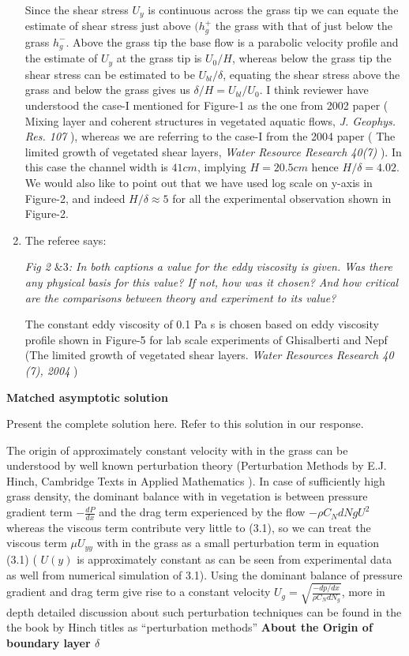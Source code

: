 \documentclass[letterpaper,10pt]{article}
\begin{document}
\begin{enumerate}
Since the shear stress $U_y$ is continuous across the grass tip we can equate the estimate of shear stress just above $(h_g^+$ the grass with that of just below the grass $h_g^{-}$. 
Above the grass tip the base flow is a parabolic velocity profile and the estimate of $U_y$ at the grass tip is $U_0/H$, whereas below the grass tip the shear stress can be estimated to be $U_{bl}/\delta$, equating the shear stress above the grass and below the grass gives us $\delta/H = U_{bl}/U_0$.
I think reviewer have understood the case-I mentioned for Figure-1 as the one from 2002 paper ( Mixing layer and coherent structures in vegetated aquatic flows, \textit{J. Geophys. Res. 107} ), whereas we are referring to the case-I from the 2004 paper ( The limited growth of vegetated shear layers, \textit{Water Resource Research 40(7)} ). In this case the channel width is $41cm$, implying $H=20.5 cm$ hence $H/\delta=4.02$. We would also like to point out that we have used log scale on y-axis in Figure-2, and indeed $H/\delta \approx 5$ for all the experimental observation shown in Figure-2.


\item The referee says:

\textit{  Fig 2 $\& 3$:
In both captions a value for the eddy viscosity is given. Was there any
physical basis for this value? If not, how was it chosen? And how critical
are the comparisons between theory and experiment to its value?
}

The constant eddy viscosity of 0.1 Pa s is chosen based on eddy viscosity profile shown in Figure-5 for lab scale experiments of Ghisalberti and Nepf (The limited growth of vegetated shear layers. \textit{Water Resources Research 40 (7), 2004} )



\end{enumerate}

\newpage
\centerline{\textbf{Matched asymptotic solution}}
Present the complete solution here. Refer to this solution in our response.

The origin of approximately constant velocity with in the grass 
can be understood by well known perturbation theory (Perturbation Methods by E.J. Hinch, Cambridge Texts in Applied Mathematics ). In case of sufficiently high grass density, the dominant balance
with in vegetation is between pressure gradient term $-\frac{dP}{dx}$ and the drag term experienced by the flow $-\rho C_N dNg U^2$ whereas the viscous term contribute very little 
to (3.1), so we can treat the viscous term $\mu U_{yy}$ with in the grass as a small perturbation term in equation (3.1) ( $U(y)$ is approximately constant as can be seen from experimental data as well from
numerical simulation of 3.1). Using the dominant balance of pressure gradient and drag term 
give rise to a constant velocity $U_g = \sqrt{\frac{-dp/dx}{\rho C_N d N_g}}$, more in depth detailed discussion about such perturbation techniques can be found in the the book by Hinch titles as ``perturbation
methods''
\newline
\textbf{ About the Origin of boundary layer $\delta$}
\end{document}

